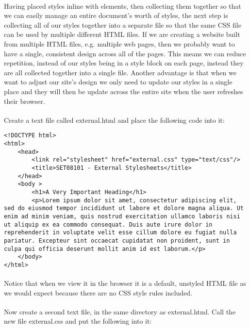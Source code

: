 \documentclass[10pt, a4paper]{article}
\begin{document}
\paragraph{} Having placed styles inline with elements, then collecting them together so that we can easily manage an entire document's worth of styles, the next step is collecting all of our styles together into a separate file so that the same CSS file can be used by multiple different HTML files. If we are creating a website built from multiple HTML files, e.g. multiple web pages, then we probably want to have a single, consistent design across all of the pages. This means we can reduce repetition, instead of our styles being in a style block on each page, instead they are all collected together into a single file. Another advantage is that when we want to adjust our site's design we only need to update our styles in a single place and they will then be update across the entire site when the user refreshes their browser.

\paragraph{} Create a text file called external.html and place the following code into it:

\begin{lstlisting}
<!DOCTYPE html>
<html>
    <head>
        <link rel="stylesheet" href="external.css" type="text/css"/>
        <title>SET08101 - External Stylesheets</title>
    </head>
    <body >
        <h1>A Very Important Heading</h1>
        <p>Lorem ipsum dolor sit amet, consectetur adipiscing elit, sed do eiusmod tempor incididunt ut labore et dolore magna aliqua. Ut enim ad minim veniam, quis nostrud exercitation ullamco laboris nisi ut aliquip ex ea commodo consequat. Duis aute irure dolor in reprehenderit in voluptate velit esse cillum dolore eu fugiat nulla pariatur. Excepteur sint occaecat cupidatat non proident, sunt in culpa qui officia deserunt mollit anim id est laborum.</p>
    </body>
</html>
\end{lstlisting}

\paragraph{} Notice that when we view it in the browser it is a default, unstyled HTML file as we would expect because there are no CSS style rules included. 

\paragraph{} Now create a second text file, in the same directory as external.html. Call the new file external.css and put the following into it:
\end{document}
